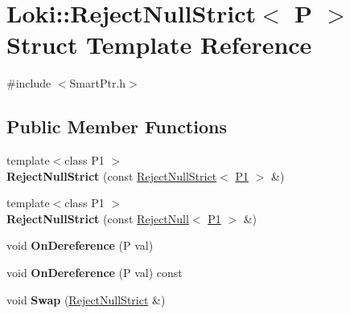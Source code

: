 \hypertarget{structLoki_1_1RejectNullStrict}{}\section{Loki\+:\+:Reject\+Null\+Strict$<$ P $>$ Struct Template Reference}
\label{structLoki_1_1RejectNullStrict}


{\ttfamily \#include $<$Smart\+Ptr.\+h$>$}

\subsection*{Public Member Functions}
\begin{DoxyCompactItemize}
\item 
\hypertarget{structLoki_1_1RejectNullStrict_acc723c37d6690c56e2d65082e09d7060}{}{\footnotesize template$<$class P1 $>$ }\\{\bfseries Reject\+Null\+Strict} (const \hyperlink{structLoki_1_1RejectNullStrict}{Reject\+Null\+Strict}$<$ \hyperlink{structP1}{P1} $>$ \&)\label{structLoki_1_1RejectNullStrict_acc723c37d6690c56e2d65082e09d7060}

\item 
\hypertarget{structLoki_1_1RejectNullStrict_a07cbb1db8f9e4a67a46fd397c5b98901}{}{\footnotesize template$<$class P1 $>$ }\\{\bfseries Reject\+Null\+Strict} (const \hyperlink{structLoki_1_1RejectNull}{Reject\+Null}$<$ \hyperlink{structP1}{P1} $>$ \&)\label{structLoki_1_1RejectNullStrict_a07cbb1db8f9e4a67a46fd397c5b98901}

\item 
\hypertarget{structLoki_1_1RejectNullStrict_a232df406210b0e98506e90cc7897615b}{}void {\bfseries On\+Dereference} (P val)\label{structLoki_1_1RejectNullStrict_a232df406210b0e98506e90cc7897615b}

\item 
\hypertarget{structLoki_1_1RejectNullStrict_a10065f40ee685b237f32fa7b1a1fbe2e}{}void {\bfseries On\+Dereference} (P val) const \label{structLoki_1_1RejectNullStrict_a10065f40ee685b237f32fa7b1a1fbe2e}

\item 
\hypertarget{structLoki_1_1RejectNullStrict_a0572749480ad62ec04c15bde1104c0ea}{}void {\bfseries Swap} (\hyperlink{structLoki_1_1RejectNullStrict}{Reject\+Null\+Strict} \&)\label{structLoki_1_1RejectNullStrict_a0572749480ad62ec04c15bde1104c0ea}

\end{DoxyCompactItemize}
